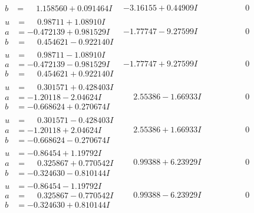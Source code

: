 \documentclass[1p]{elsarticle_modified}
\theoremstyle{definition}
\begin{document}
$$\begin{array}{c|c|c}
\begin{aligned}
b &= \phantom{-}1.158560 + 0.091464 I\end{aligned}
 & -3.16155 + 0.44909 I & \phantom{-0.000000 } 0 \\ \hline\begin{aligned}
u &= \phantom{-}0.98711 + 1.08910 I \\
a &= -0.472139 + 0.981529 I \\
b &= \phantom{-}0.454621 - 0.922140 I\end{aligned}
 & -1.77747 - 9.27599 I & \phantom{-0.000000 } 0 \\ \hline\begin{aligned}
u &= \phantom{-}0.98711 - 1.08910 I \\
a &= -0.472139 - 0.981529 I \\
b &= \phantom{-}0.454621 + 0.922140 I\end{aligned}
 & -1.77747 + 9.27599 I & \phantom{-0.000000 } 0 \\ \hline\begin{aligned}
u &= \phantom{-}0.301571 + 0.428403 I \\
a &= -1.20118 - 2.04624 I \\
b &= -0.668624 + 0.270674 I\end{aligned}
 & \phantom{-}2.55386 - 1.66933 I & \phantom{-0.000000 } 0 \\ \hline\begin{aligned}
u &= \phantom{-}0.301571 - 0.428403 I \\
a &= -1.20118 + 2.04624 I \\
b &= -0.668624 - 0.270674 I\end{aligned}
 & \phantom{-}2.55386 + 1.66933 I & \phantom{-0.000000 } 0 \\ \hline\begin{aligned}
u &= -0.86454 + 1.19792 I \\
a &= \phantom{-}0.325867 + 0.770542 I \\
b &= -0.324630 - 0.810144 I\end{aligned}
 & \phantom{-}0.99388 + 6.23929 I & \phantom{-0.000000 } 0 \\ \hline\begin{aligned}
u &= -0.86454 - 1.19792 I \\
a &= \phantom{-}0.325867 - 0.770542 I \\
b &= -0.324630 + 0.810144 I\end{aligned}
 & \phantom{-}0.99388 - 6.23929 I & \phantom{-0.000000 } 0 \\ \hline\begin{aligned}

\end{aligned}
\end{array}$$
\end{document}
